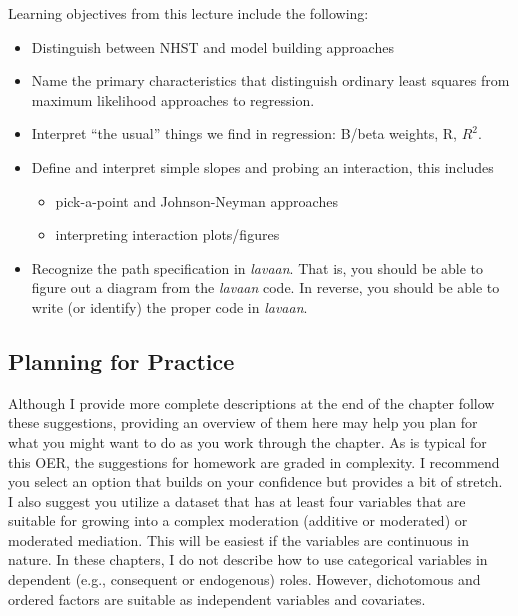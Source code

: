\documentclass[
  11pt,
]{book}
\providecommand{\tightlist}{%
  \setlength{\itemsep}{0pt}\setlength{\parskip}{0pt}}
\begin{document}
Learning objectives from this lecture include the following:

\begin{itemize}
\tightlist
\item
  Distinguish between NHST and model building approaches
\item
  Name the primary characteristics that distinguish ordinary least squares from maximum likelihood approaches to regression.
\item
  Interpret ``the usual'' things we find in regression: B/beta weights, R, \(R^{2}\).
\item
  Define and interpret simple slopes and probing an interaction, this includes

  \begin{itemize}
  \tightlist
  \item
    pick-a-point and Johnson-Neyman approaches
  \item
    interpreting interaction plots/figures
  \end{itemize}
\item
  Recognize the path specification in \emph{lavaan}. That is, you should be able to figure out a diagram from the \emph{lavaan} code. In reverse, you should be able to write (or identify) the proper code in \emph{lavaan}.
\end{itemize}

\hypertarget{planning-for-practice-6}{%
\subsection{Planning for Practice}\label{planning-for-practice-6}}

Although I provide more complete descriptions at the end of the chapter follow these suggestions, providing an overview of them here may help you plan for what you might want to do as you work through the chapter. As is typical for this OER, the suggestions for homework are graded in complexity. I recommend you select an option that builds on your confidence but provides a bit of stretch. I also suggest you utilize a dataset that has at least four variables that are suitable for growing into a complex moderation (additive or moderated) or moderated mediation. This will be easiest if the variables are continuous in nature. In these chapters, I do not describe how to use categorical variables in dependent (e.g., consequent or endogenous) roles. However, dichotomous and ordered factors are suitable as independent variables and covariates.
\end{document}
